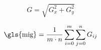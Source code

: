             \begin{equation}
                G = \sqrt{G_x^2 + G_y^2}
                \label{eqn:mag_eqn}
            \end{equation}

            \begin{equation}
                \text{\gls{mig}} = \frac{1}{m \cdot n} \sum_{i=0}^{m} \sum_{j=0}^{n} G_{ij}
                \label{eqn:mig}
            \end{equation}


    
